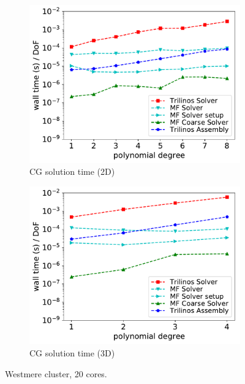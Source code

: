 \documentclass[AMA,STIX1COL]{WileyNJD-v2}
\begin{document}
\begin{figure}[!ht]
\begin{subfigure}[b]{0.49\textwidth}
    \centering
    \includegraphics[width=\textwidth]{IWR_newest_patched_solver2d.pdf}
    \caption{CG solution time (2D)}
    \label{fig:benchmark_miehe_IWR_sol2}
  \end{subfigure}
  \begin{subfigure}[b]{0.49\textwidth}
    \centering
    \includegraphics[width=\textwidth]{IWR_newest_patched_solver3d.pdf}
    \caption{CG solution time (3D)}
    \label{fig:benchmark_miehe_IWR_sol3}
  \end{subfigure}
  \caption{{\color{red}Westmere} cluster, 20 cores.}%
  \label{fig:benchmark_miehe_IWR_cg}
\end{figure}
\end{document}
